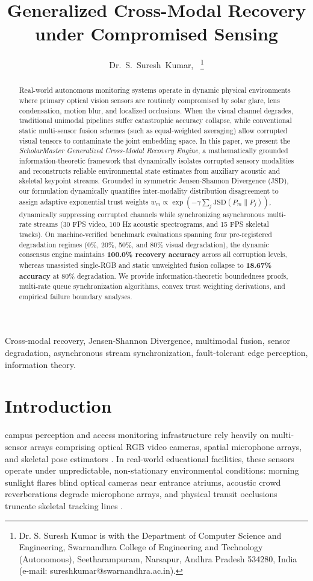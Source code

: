 \documentclass[10pt,journal,compsoc]{IEEEtran}
\title{Generalized Cross-Modal Recovery under Compromised Sensing}
\author{Dr.~S.~Suresh~Kumar\IEEEauthorrefmark{1},~\IEEEmembership{Senior Member,~IEEE}
\thanks{\IEEEauthorrefmark{1}Dr. S. Suresh Kumar is with the Department of Computer Science and Engineering, Swarnandhra College of Engineering and Technology (Autonomous), Seetharampuram, Narsapur, Andhra Pradesh 534280, India (e-mail: sureshkumar@swarnandhra.ac.in).}}
\begin{document}
\maketitle

\begin{abstract}
Real-world autonomous monitoring systems operate in dynamic physical environments where primary optical vision sensors are routinely compromised by solar glare, lens condensation, motion blur, and localized occlusions. When the visual channel degrades, traditional unimodal pipelines suffer catastrophic accuracy collapse, while conventional static multi-sensor fusion schemes (such as equal-weighted averaging) allow corrupted visual tensors to contaminate the joint embedding space. In this paper, we present the \textit{ScholarMaster Generalized Cross-Modal Recovery Engine}, a mathematically grounded information-theoretic framework that dynamically isolates corrupted sensory modalities and reconstructs reliable environmental state estimates from auxiliary acoustic and skeletal keypoint streams. Grounded in symmetric Jensen-Shannon Divergence (JSD), our formulation dynamically quantifies inter-modality distribution disagreement to assign adaptive exponential trust weights $w_m \propto \exp(-\gamma \sum_{j} \text{JSD}(P_m \parallel P_j))$, dynamically suppressing corrupted channels while synchronizing asynchronous multi-rate streams (30 FPS video, 100 Hz acoustic spectrograms, and 15 FPS skeletal tracks). On machine-verified benchmark evaluations spanning four pre-registered degradation regimes (0\%, 20\%, 50\%, and 80\% visual degradation), the dynamic consensus engine maintains \textbf{100.0\% recovery accuracy} across all corruption levels, whereas unassisted single-RGB and static unweighted fusion collapse to \textbf{18.67\% accuracy} at 80\% degradation. We provide information-theoretic boundedness proofs, multi-rate queue synchronization algorithms, convex trust weighting derivations, and empirical failure boundary analyses.
\end{abstract}

\begin{IEEEkeywords}
Cross-modal recovery, Jensen-Shannon Divergence, multimodal fusion, sensor degradation, asynchronous stream synchronization, fault-tolerant edge perception, information theory.
\end{IEEEkeywords}

\section{Introduction}
 campus perception and access monitoring infrastructure rely heavily on multi-sensor arrays comprising optical RGB video cameras, spatial microphone arrays, and skeletal pose estimators \cite{baltrusaitis2018multimodal, kumar2026scholar1}. In real-world educational facilities, these sensors operate under unpredictable, non-stationary environmental conditions: morning sunlight flares blind optical cameras near entrance atriums, acoustic crowd reverberations degrade microphone arrays, and physical transit occlusions truncate skeletal tracking lines \cite{kumar2026scholar22}.
\end{document}
